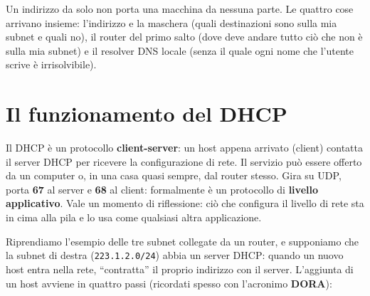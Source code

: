 Un indirizzo da solo non porta una macchina da nessuna parte. Le quattro cose arrivano insieme: l'indirizzo e la maschera
(quali destinazioni sono sulla mia subnet e quali no), il router del primo salto (dove deve andare tutto ciò che non è sulla
mia subnet) e il resolver DNS locale (senza il quale ogni nome che l'utente scrive è irrisolvibile).

\section{Il funzionamento del DHCP}

Il DHCP è un protocollo \textbf{client-server}: un host appena arrivato (client) contatta il server DHCP per ricevere
la configurazione di rete. Il servizio può essere offerto da un computer o, in una casa quasi sempre, dal router stesso.
Gira su UDP, porta \textbf{67} al server e \textbf{68} al client: formalmente è un protocollo di \textbf{livello
applicativo}. Vale un momento di riflessione: ciò che configura il livello di rete sta in cima alla pila e lo usa come
qualsiasi altra applicazione.

Riprendiamo l'esempio delle tre subnet collegate da un router, e supponiamo che la subnet di destra
(\texttt{223.1.2.0/24}) abbia un server DHCP: quando un nuovo host entra nella rete, ``contratta'' il proprio indirizzo
con il server. L'aggiunta di un host avviene in quattro passi (ricordati spesso con l'acronimo \textbf{DORA}):

